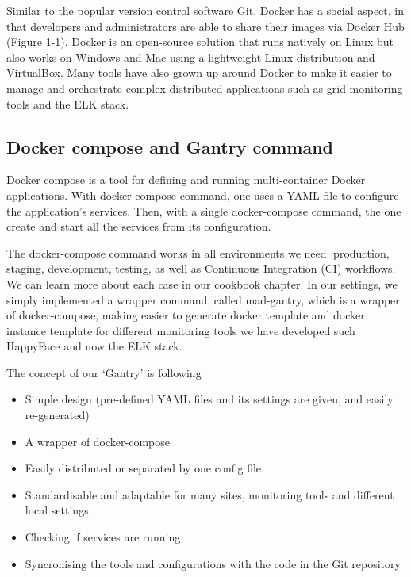 \documentclass[]{article}
\begin{document}
Similar to the popular version control software Git, Docker has a social
aspect, in that developers and administrators are able to share their
images via Docker Hub (Figure 1-1). Docker is an open-source solution
that runs natively on Linux but also works on Windows and Mac using a
lightweight Linux distribution and VirtualBox. Many tools have also
grown up around Docker to make it easier to manage and orchestrate
complex distributed applications such as grid monitoring tools and the
ELK stack.

\subsection{Docker compose and Gantry
command}\label{docker-compose-and-gantry-command}

Docker compose is a tool for defining and running multi-container Docker
applications. With docker-compose command, one uses a YAML file to
configure the application's services. Then, with a single docker-compose
command, the one create and start all the services from its
configuration.

The docker-compose command works in all environments we need:
production, staging, development, testing, as well as Continuous
Integration (CI) workflows. We can learn more about each case in our
cookbook chapter. In our settings, we simply implemented a wrapper
command, called mad-gantry, which is a wrapper of docker-compose, making
easier to generate docker template and docker instance template for
different monitoring tools we have developed such HappyFace and now the
ELK stack.

The concept of our `Gantry' is following

\begin{itemize}
\itemsep1pt\parskip0pt
\item
  Simple design (pre-defined YAML files and its settings are given, and
  easily re-generated)
\item
  A wrapper of docker-compose
\item
  Easily distributed or separated by one config file
\item
  Standardisable and adaptable for many sites, monitoring tools and
  different local settings
\item
  Checking if services are running
\item
  Syncronising the tools and configurations with the code in the Git
  repository
\end{itemize}
\end{document}
